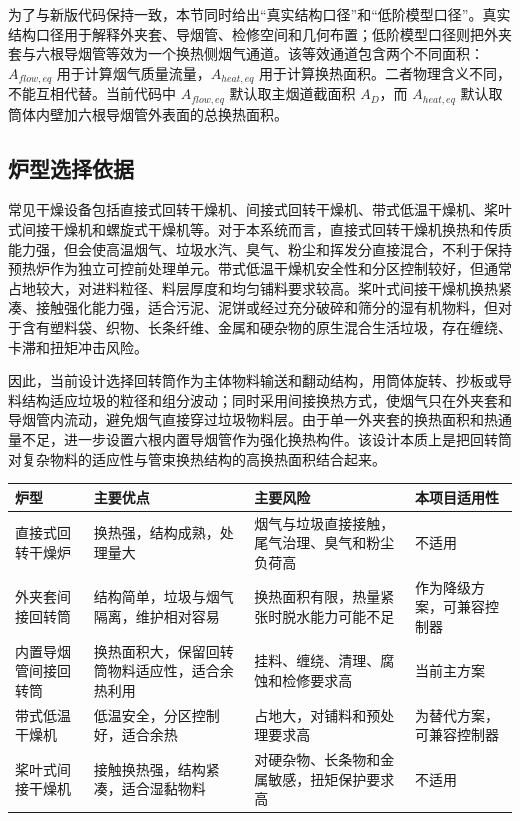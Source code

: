 \documentclass[UTF8,openany,zihao=-4,oneside]{ctexbook}
\begin{document}
为了与新版代码保持一致，本节同时给出“真实结构口径”和“低阶模型口径”。真实结构口径用于解释外夹套、导烟管、检修空间和几何布置；低阶模型口径则把外夹套与六根导烟管等效为一个换热侧烟气通道。该等效通道包含两个不同面积：\(A_{flow,eq}\) 用于计算烟气质量流量，\(A_{heat,eq}\) 用于计算换热面积。二者物理含义不同，不能互相代替。当前代码中 \(A_{flow,eq}\) 默认取主烟道截面积 \(A_D\)，而 \(A_{heat,eq}\) 默认取筒体内壁加六根导烟管外表面的总换热面积。

\subsection{炉型选择依据}\label{ux7089ux578bux9009ux62e9ux4f9dux636e}

常见干燥设备包括直接式回转干燥机、间接式回转干燥机、带式低温干燥机、桨叶式间接干燥机和螺旋式干燥机等。对于本系统而言，直接式回转干燥机换热和传质能力强，但会使高温烟气、垃圾水汽、臭气、粉尘和挥发分直接混合，不利于保持预热炉作为独立可控前处理单元。带式低温干燥机安全性和分区控制较好，但通常占地较大，对进料粒径、料层厚度和均匀铺料要求较高。桨叶式间接干燥机换热紧凑、接触强化能力强，适合污泥、泥饼或经过充分破碎和筛分的湿有机物料，但对于含有塑料袋、织物、长条纤维、金属和硬杂物的原生混合生活垃圾，存在缠绕、卡滞和扭矩冲击风险。

因此，当前设计选择回转筒作为主体物料输送和翻动结构，用筒体旋转、抄板或导料结构适应垃圾的粒径和组分波动；同时采用间接换热方式，使烟气只在外夹套和导烟管内流动，避免烟气直接穿过垃圾物料层。由于单一外夹套的换热面积和热通量不足，进一步设置六根内置导烟管作为强化换热构件。该设计本质上是把回转筒对复杂物料的适应性与管束换热结构的高换热面积结合起来。

\begin{longtable}[c]{@{}p{}p{}p{}p{}@{}}
\toprule\noalign{}
炉型 & 主要优点 & 主要风险 & 本项目适用性 \\
\midrule\noalign{}
\endhead
\bottomrule\noalign{}
\endlastfoot
直接式回转干燥炉 & 换热强，结构成熟，处理量大 & 烟气与垃圾直接接触，尾气治理、臭气和粉尘负荷高 & 不适用 \\
外夹套间接回转筒 & 结构简单，垃圾与烟气隔离，维护相对容易 & 换热面积有限，热量紧张时脱水能力可能不足 & 作为降级方案，可兼容控制器 \\
内置导烟管间接回转筒 & 换热面积大，保留回转筒物料适应性，适合余热利用 & 挂料、缠绕、清理、腐蚀和检修要求高 & 当前主方案 \\
带式低温干燥机 & 低温安全，分区控制好，适合余热 & 占地大，对铺料和预处理要求高 & 为替代方案，可兼容控制器 \\
桨叶式间接干燥机 & 接触换热强，结构紧凑，适合湿黏物料 & 对硬杂物、长条物和金属敏感，扭矩保护要求高 & 不适用 \\
\end{longtable}
\end{document}
